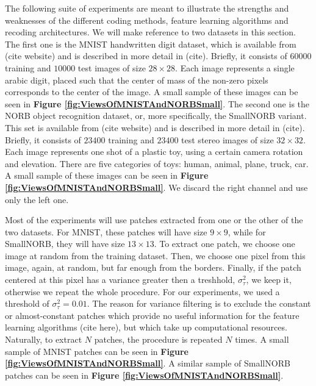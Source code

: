 \documentclass[12pt,a4paper,oneside,english]{UPBThesis}
\newcommand{\hctimes}[2]{{#1}\!\times\!{#2}}
\begin{document}
The following suite of experiments are meant to illustrate the strengths and weaknesses of the different coding methods, feature learning algorithms and recoding architectures. We will make reference to two datasets in this section. The first one is the MNIST handwritten digit dataset, which is available from (cite website) and is described in more detail in (cite). Briefly, it consists of $60000$ training and $10000$ test images of size $\hctimes{28}{28}$. Each image represents a single arabic digit, placed such that the center of mass of the non-zero pixels corresponds to the center of the image. A small sample of these images can be seen in \textbf{Figure \ref{fig:ViewsOfMNISTAndNORBSmall}}. The second one is the NORB object recognition dataset, or, more specifically, the SmallNORB variant. This set is available from (cite website) and is described in more detail in (cite). Briefly, it consists of $23400$ training and $23400$ test stereo images of size $\hctimes{32}{32}$. Each image represents one shot of a plastic toy, using a certain camera rotation and elevation. There are five categories of toys: human, animal, plane, truck, car. A small sample of these images can be seen in \textbf{Figure \ref{fig:ViewsOfMNISTAndNORBSmall}}. We discard the right channel and use only the left one.

Most of the experiments will use patches extracted from one or the other of the two datasets. For MNIST, these patches will have size $\hctimes{9}{9}$, while for SmallNORB, they will have size $\hctimes{13}{13}$. To extract one patch, we choose one image at random from the training dataset. Then, we choose one pixel from this image, again, at random, but far enough from the borders. Finally, if the patch centered at this pixel has a variance greater then a treshhold, $\sigma^2_\tau$, we keep it, otherwise we repeat the whole procedure. For our experiments, we used a threshold of $\sigma^2_\tau = 0.01$. The reason for variance filtering is to exclude the constant or almost-constant patches which provide no useful information for the feature learning algorithms (cite here), but which take up computational resources. Naturally, to extract $N$ patches, the procedure is repeated $N$ times. A small sample of MNIST patches can be seen in \textbf{Figure \ref{fig:ViewsOfMNISTAndNORBSmall}}. A similar sample of SmallNORB patches can be seen in \textbf{Figure \ref{fig:ViewsOfMNISTAndNORBSmall}}.
\end{document}
